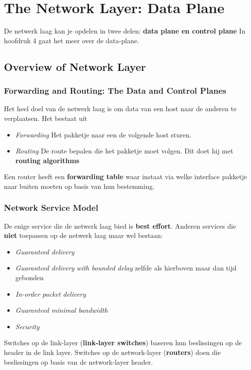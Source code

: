\section{The Network Layer: Data Plane}
De netwerk laag kan je opdelen in twee delen: \textbf{data plane en control plane} In hoofdruk 4 gaat het meer over de data-plane.

\subsection{Overview of Network Layer}
\subsubsection{Forwarding and Routing: The Data and Control Planes}
Het heel doel van de netwerk laag is om data van een host naar de anderen te verplaatsen. Het bestaat uit
\begin{itemize}
    \item \textit{Forwarding} Het pakketje naar een de volgende host sturen.
    \item \textit{Routing} De route bepalen die het pakketje moet volgen. Dit doet hij met \textbf{routing algorithms}
\end{itemize}
Een router heeft een \textbf{forwarding table} waar instaat via welke interface pakketje naar buiten moeten op basis van hun bestemming.
\subsubsection{Network Service Model}
De enige service die de netwerk laag bied is \textbf{best effort}. Anderen services die \textbf{niet} toepassen op de netwerk laag maar wel bestaan:

\begin{itemize}
    \item \textit{Guaranteed delivery}
    \item \textit{Guaranteed delivery with bounded delay} zelfde als hierboven maar dan tijd gebonden
    \item \textit{In-order packet delivery}
    \item \textit{Guaranteed minimal bandwidth}
    \item \textit{Security}
\end{itemize}
\newline
Switches op de link-layer (\textbf{link-layer switches}) baseren hun beslissingen op de header in de link layer. Switches op de network-layer (\textbf{routers}) doen die beslissingen op basis van de network-layer header.

